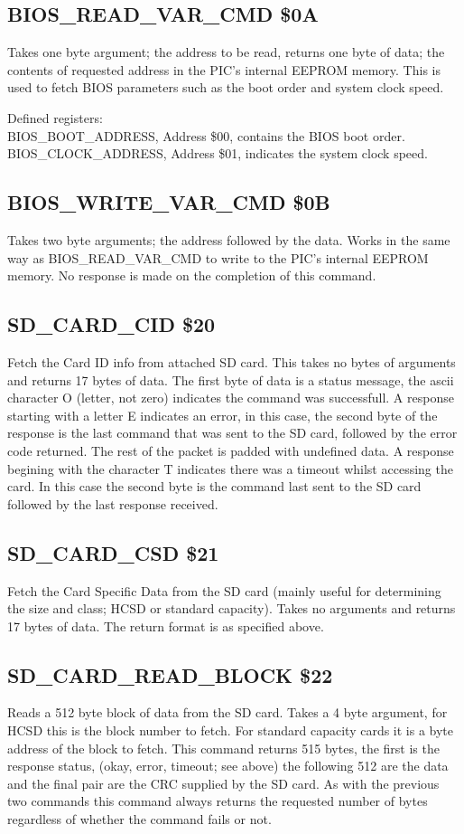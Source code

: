 \subsection{BIOS\_READ\_VAR\_CMD \$0A}
Takes one byte argument; the address to be read, returns one byte of data; the
contents of requested address in the PIC's internal EEPROM memory.  This is used
to fetch BIOS parameters such as the boot order and system clock speed.

Defined registers:\\
\noindent BIOS\_BOOT\_ADDRESS, Address \$00, contains the BIOS boot order.
\noindent BIOS\_CLOCK\_ADDRESS, Address \$01, indicates the system clock speed.

\subsection{BIOS\_WRITE\_VAR\_CMD \$0B}
Takes two byte arguments; the address followed by the data.  Works in the same
way as BIOS\_READ\_VAR\_CMD to write to the PIC's internal EEPROM memory.  No
response is made on the completion of this command.

\subsection{SD\_CARD\_CID \$20}
Fetch the Card ID info from attached SD card.  This takes no bytes of arguments
and returns 17 bytes of data.  The first byte of data is a status message, the
ascii character O (letter, not zero) indicates the command was successfull.  A
response starting with a letter E indicates an error, in this case, the second
byte of the response is the last command that was sent to the SD card, followed
by the error code returned.  The rest of the packet is padded with undefined
data.  A response begining with the character T indicates there was a timeout
whilst accessing the card.  In this case the second byte is the command last
sent to the SD card followed by the last response received.

\subsection{SD\_CARD\_CSD \$21}
Fetch the Card Specific Data from the SD card (mainly useful for determining the
size and class; HCSD or standard capacity).  Takes no arguments and returns 17
bytes of data.  The return format is as specified above.

\subsection{SD\_CARD\_READ\_BLOCK \$22}
Reads a 512 byte block of data from the SD card.  Takes a 4 byte argument, for
HCSD this is the block number to fetch.  For standard capacity cards it is a
byte address of the block to fetch.  This command returns 515 bytes, the first
is the response status, (okay, error, timeout; see above) the following 512 are
the data and the final pair are the CRC supplied by the SD card.  As with the
previous two commands this command always returns the requested number of bytes
regardless of whether the command fails or not.
